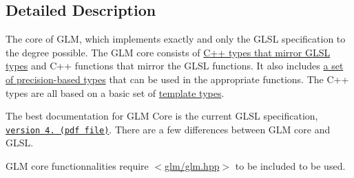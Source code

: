 \subsection{Detailed Description}
The core of G\-L\-M, which implements exactly and only the G\-L\-S\-L specification to the degree possible. The G\-L\-M core consists of \hyperlink{group__core__types}{C++ types that mirror G\-L\-S\-L types} and C++ functions that mirror the G\-L\-S\-L functions. It also includes \hyperlink{group__core__precision}{a set of precision-\/based types} that can be used in the appropriate functions. The C++ types are all based on a basic set of \hyperlink{group__core__template}{template types}.

The best documentation for G\-L\-M Core is the current G\-L\-S\-L specification, \href{http://www.opengl.org/registry/doc/GLSLangSpec.4.20.8.clean.pdf}{\tt version 4. (pdf file)}. There are a few differences between G\-L\-M core and G\-L\-S\-L.

G\-L\-M core functionnalities require $<$\hyperlink{glm_8hpp}{glm/glm.\-hpp}$>$ to be included to be used. 